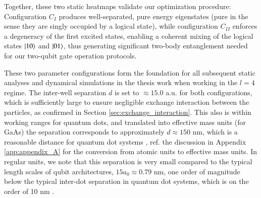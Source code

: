 \documentclass{subfiles}
\begin{document}
Together, these two static heatmaps validate our optimization procedure: Configuration $C_I$ produces well-separated, pure energy eigenstates (pure in the sense they are singly occupied by a logical state), while configuration $C_{II}$ enforces a degeneracy of the first excited states, enabling a coherent mixing of the logical states $\ket{10}$ and $\ket{01}$, thus generating significant two-body entanglement needed for our two-qubit gate operation protocols.


These two parameter configurations form the foundation for all subsequent static analyses and dynamical simulations in the thesis work when working in the $l=4$ regime. The inter-well separation $d$ is set to $\approx 15.0$ a.u. for both configurations, which is sufficiently large to ensure negligible exchange interaction between the particles, as confirmed in Section \ref{sec:exchange_interaction}. This also is within working ranges for quantum dots, and translated into effective mass units (for GaAs) the separation corresponds to approximately $d \approx 150$ nm, which is a reasonable distance for quantum dot systems \cite{garcia2021semiconductor}, ref. the discussion in Appendix \ref{app:appendix_A} for the conversion from atomic units to effective mass units. In regular units, we note that this separation is very small compared to the typical length scales of qubit architectures, $15 a_0 \approx 0.79$ nm, one order of magnitude below the typical inter-dot separation in quantum dot systems, which is on the order of 10 nm \cite{garcia2021semiconductor}. 
\end{document}
